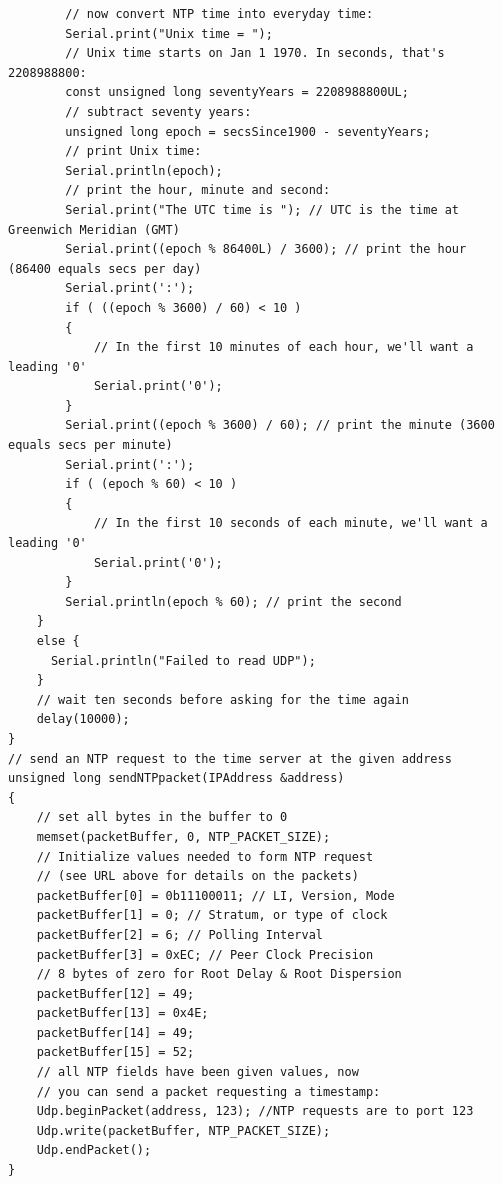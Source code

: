 \documentclass[12pt]{article}
\begin{document}
\begin{lstlisting}
        // now convert NTP time into everyday time:
        Serial.print("Unix time = ");
        // Unix time starts on Jan 1 1970. In seconds, that's 2208988800:
        const unsigned long seventyYears = 2208988800UL;
        // subtract seventy years:
        unsigned long epoch = secsSince1900 - seventyYears;
        // print Unix time:
        Serial.println(epoch);
        // print the hour, minute and second:
        Serial.print("The UTC time is "); // UTC is the time at Greenwich Meridian (GMT)
        Serial.print((epoch % 86400L) / 3600); // print the hour (86400 equals secs per day)
        Serial.print(':');
        if ( ((epoch % 3600) / 60) < 10 )
        {
            // In the first 10 minutes of each hour, we'll want a leading '0'
            Serial.print('0');
        }
        Serial.print((epoch % 3600) / 60); // print the minute (3600 equals secs per minute)
        Serial.print(':');
        if ( (epoch % 60) < 10 )
        {
            // In the first 10 seconds of each minute, we'll want a leading '0'
            Serial.print('0');
        }
        Serial.println(epoch % 60); // print the second
    }
    else {
      Serial.println("Failed to read UDP");
    }
    // wait ten seconds before asking for the time again
    delay(10000);
}
// send an NTP request to the time server at the given address
unsigned long sendNTPpacket(IPAddress &address)
{
    // set all bytes in the buffer to 0
    memset(packetBuffer, 0, NTP_PACKET_SIZE);
    // Initialize values needed to form NTP request
    // (see URL above for details on the packets)
    packetBuffer[0] = 0b11100011; // LI, Version, Mode
    packetBuffer[1] = 0; // Stratum, or type of clock
    packetBuffer[2] = 6; // Polling Interval
    packetBuffer[3] = 0xEC; // Peer Clock Precision
    // 8 bytes of zero for Root Delay & Root Dispersion
    packetBuffer[12] = 49;
    packetBuffer[13] = 0x4E;
    packetBuffer[14] = 49;
    packetBuffer[15] = 52;
    // all NTP fields have been given values, now
    // you can send a packet requesting a timestamp:
    Udp.beginPacket(address, 123); //NTP requests are to port 123
    Udp.write(packetBuffer, NTP_PACKET_SIZE);
    Udp.endPacket();
}
\end{lstlisting}
\end{document}
